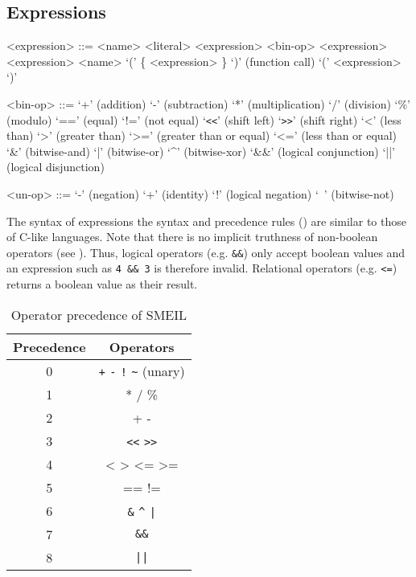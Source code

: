 
\subsection{Expressions}
\begin{grammar}
  <expression> ::= <name>
  \alt <literal>
  \alt <expression> <bin-op> <expression>
   <expression>
  \alt <name> `(' \{ <expression> \}  `)' (function call)
  \alt `(' <expression> `)'

  <bin-op> ::= `+' (addition)
  \alt `-' (subtraction)
  \alt `*' (multiplication)
  \alt `/' (division)
  \alt `\%' (modulo)
  \alt `==' (equal)
  \alt `!=' (not equal)
  \alt `\verb!<<!' (shift left)
  \alt `\verb!>>!' (shift right)
  \alt `<' (less than)
  \alt `>' (greater than)
  \alt `>=' (greater than or equal)
  \alt `<=' (less than or equal)
  \alt `\&' (bitwise-and)
  \alt `|' (bitwise-or)
  \alt `^' (bitwise-xor)
  \alt `\&\&' (logical conjunction)
  \alt `||' (logical disjunction)

  <un-op> ::= `-' (negation)
  \alt `+' (identity)
  \alt `!' (logical negation)
  \alt `~' (bitwise-not)

\end{grammar}

The syntax of expressions the syntax and precedence rules () are
similar to those of C-like languages. Note that there is no implicit truthness
of non-boolean operators (see ). Thus, logical operators
(e.g. \texttt{\&\&}) only accept boolean values and an expression such as
\texttt{4 \&\& 3} is therefore invalid. Relational operators (e.g. \texttt{<=})
returns a boolean value as their result.


\begin{table}%
  \centering
\begin{tabular}{cc}
  \toprule
  \textbf{Precedence} & \textbf{Operators}\\
  \midrule
  0 & \verb!+! \verb!-! \verb|!| \verb!~! (unary)\\
  1 & * / \% \\
  2 & + - \\
  3 & \verb!<<! \verb!>>! \\
  4 & < > <= >= \\
  5 & == != \\
  6 & \verb!&! \verb!^! \verb!|! \\
  7 & \verb!&&! \\
  8 & \verb!||! \\
  \bottomrule
\end{tabular}
\caption{Operator precedence of SMEIL}
\label{tab:ops}
\end{table}

